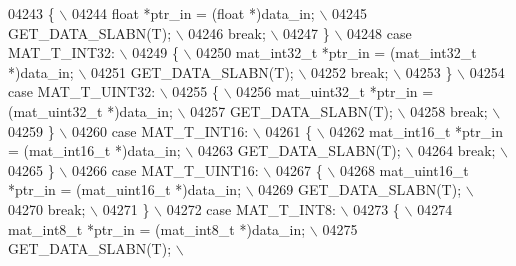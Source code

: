 \begin{DoxyCode}
{{{{{{{{{{{{{{{{{{{{{{{{{04243 \textcolor{preprocessor}{            \{ \(\backslash\)}
04244 \textcolor{preprocessor}{                float *ptr\_in = (float *)data\_in; \(\backslash\)}
04245 \textcolor{preprocessor}{                GET\_DATA\_SLABN(T); \(\backslash\)}
04246 \textcolor{preprocessor}{                break; \(\backslash\)}
04247 \textcolor{preprocessor}{            \} \(\backslash\)}
04248 \textcolor{preprocessor}{            case MAT\_T\_INT32: \(\backslash\)}
04249 \textcolor{preprocessor}{            \{ \(\backslash\)}
04250 \textcolor{preprocessor}{                mat\_int32\_t *ptr\_in = (mat\_int32\_t *)data\_in; \(\backslash\)}
04251 \textcolor{preprocessor}{                GET\_DATA\_SLABN(T); \(\backslash\)}
04252 \textcolor{preprocessor}{                break; \(\backslash\)}
04253 \textcolor{preprocessor}{            \} \(\backslash\)}
04254 \textcolor{preprocessor}{            case MAT\_T\_UINT32: \(\backslash\)}
04255 \textcolor{preprocessor}{            \{ \(\backslash\)}
04256 \textcolor{preprocessor}{                mat\_uint32\_t *ptr\_in = (mat\_uint32\_t *)data\_in; \(\backslash\)}
04257 \textcolor{preprocessor}{                GET\_DATA\_SLABN(T); \(\backslash\)}
04258 \textcolor{preprocessor}{                break; \(\backslash\)}
04259 \textcolor{preprocessor}{            \} \(\backslash\)}
04260 \textcolor{preprocessor}{            case MAT\_T\_INT16: \(\backslash\)}
04261 \textcolor{preprocessor}{            \{ \(\backslash\)}
04262 \textcolor{preprocessor}{                mat\_int16\_t *ptr\_in = (mat\_int16\_t *)data\_in; \(\backslash\)}
04263 \textcolor{preprocessor}{                GET\_DATA\_SLABN(T); \(\backslash\)}
04264 \textcolor{preprocessor}{                break; \(\backslash\)}
04265 \textcolor{preprocessor}{            \} \(\backslash\)}
04266 \textcolor{preprocessor}{            case MAT\_T\_UINT16: \(\backslash\)}
04267 \textcolor{preprocessor}{            \{ \(\backslash\)}
04268 \textcolor{preprocessor}{                mat\_uint16\_t *ptr\_in = (mat\_uint16\_t *)data\_in; \(\backslash\)}
04269 \textcolor{preprocessor}{                GET\_DATA\_SLABN(T); \(\backslash\)}
04270 \textcolor{preprocessor}{                break; \(\backslash\)}
04271 \textcolor{preprocessor}{            \} \(\backslash\)}
04272 \textcolor{preprocessor}{            case MAT\_T\_INT8: \(\backslash\)}
04273 \textcolor{preprocessor}{            \{ \(\backslash\)}
04274 \textcolor{preprocessor}{                mat\_int8\_t *ptr\_in = (mat\_int8\_t *)data\_in; \(\backslash\)}
04275 \textcolor{preprocessor}{                GET\_DATA\_SLABN(T); \(\backslash\)}
}}}}}}}}}}}}}}}}}}}}}}}}}
\end{DoxyCode}

